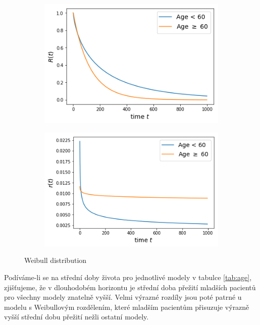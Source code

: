 \documentclass[10pt]{article}
\begin{document}
       \begin{figure}[htb!]
\centering
    \begin{subfigure}{.4\linewidth}
    \centering
    \includegraphics[width=.99\textwidth]{Images/age/Swei.png}
  \end{subfigure}%
    \begin{subfigure}{.4\linewidth}
    \centering
    \includegraphics[width=.99\textwidth]{Images/age/rwei.png}
  \end{subfigure}%
  \caption{Weibull distribution}\label{fig:karexp} 
   \end{figure} 
Podíváme-li se na střední doby života pro jednotlivé modely v tabulce \ref{tab:age}, zjišťujeme, že v dlouhodobém horizontu je střední doba přežití mladších pacientů pro všechny modely znatelně vyšší. Velmi výrazné rozdíly jsou poté patrné u modelu s Weibullovým rozdělením, které mladším pacientům přisuzuje výrazně vyšší střední dobu přežití nežli ostatní modely.
\end{document}
